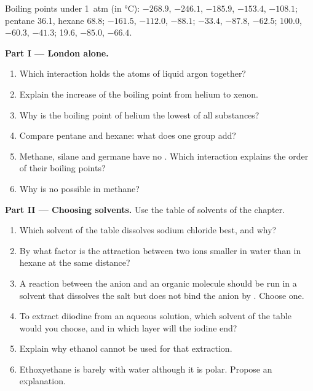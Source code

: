 \begin{problem}
\label{pb:b1:intermolecular-forces-solvents:1}
Boiling points under \qty{1}{atm} (in \unit{\celsius}):  $-268.9$,
 $-246.1$,  $-185.9$,  $-153.4$,  $-108.1$;
pentane 36.1, hexane 68.8;  $-161.5$,  $-112.0$,
 $-88.1$;  $-33.4$,  $-87.8$,  $-62.5$;
 100.0,  $-60.3$,  $-41.3$;  19.6,
 $-85.0$,  $-66.4$.

\medskip
\noindent\textbf{Part I --- London alone.}
\begin{enumerate}
  \item Which interaction holds the atoms of liquid argon together?
  \item Explain the increase of the boiling point from helium to xenon.
  \item Why is the boiling point of helium the lowest of all substances?
  \item Compare pentane and hexane: what does one  group add?
  \item Methane, silane and germane have no . Which
        interaction explains the order of their boiling points?
  \item Why is no  possible in methane?
\end{enumerate}

\medskip
\noindent\textbf{Part II --- Choosing solvents.}
Use the table of solvents of the chapter.
\begin{enumerate}[resume]
  \item Which solvent of the table dissolves sodium chloride best, and
        why?
  \item By what factor is the attraction between two ions smaller in
        water than in hexane at the same distance?
  \item A reaction between the anion  and an organic molecule
        should be run in a solvent that dissolves the salt but does not
        bind the anion by . Choose one.
  \item To extract diiodine from an aqueous solution, which solvent of the
        table would you choose, and in which layer will the iodine end?
  \item Explain why ethanol cannot be used for that extraction.
  \item Ethoxyethane is barely  with water although it is polar.
        Propose an explanation.
\end{enumerate}


\end{problem}
